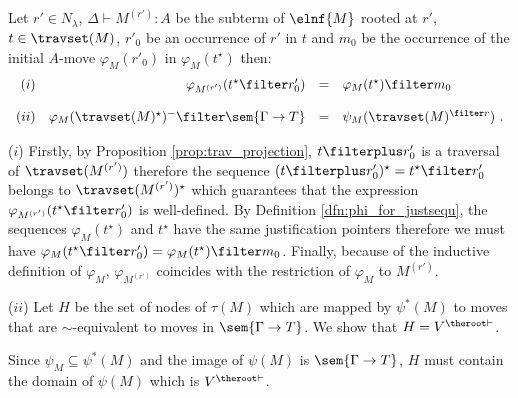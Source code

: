 \begin{lemma}
\label{lem:varphi_proj} Let $r'\in N_\lambda$, $\Delta \vdash
M^{(r')} : A$ be the subterm of $\elnf{M}$ rooted at $r'$,
$t\in\travset(M)$, $r'_0$ be an occurrence of $r'$ in $t$ and $m_0$
be the occurrence of the initial $A$-move $\varphi_M(r'_0)$ in
$\varphi_M(t^\star)$ then:
$$\begin{array}{rrcl}
(i)& \varphi_{M^{(r')}}(t^\star \filter r'_0) &=& \varphi_M(t^\star) \filter m_0 \\ \\
(ii) & \varphi_M(\travset(M)^\star)^- \filter \sem{\Gamma \rightarrow T} &=& \psi_M(\travset(M)^{\filter r})\ .
\end{array}
$$
\end{lemma}
\proof ($i$) Firstly, by Proposition \ref{prop:trav_projection},
$t\filterplus r'_0$ is a traversal of $\travset(M^{(r')})$ therefore
the sequence $(t\filterplus r'_0)^\star = t^\star \filter r'_0$
belongs to $\travset(M^{(r')})^\star$ which guarantees that the
expression $\varphi_{M^{(r')}}(t^\star \filter r'_0)$ is
well-defined. By Definition \ref{dfn:phi_for_justsequ}, the
sequences $\varphi_M(t^\star)$ and $t^\star$ have the same
justification pointers therefore
 we must have $\varphi_{M}(t^\star \filter r'_0) = \varphi_M(t^\star) \filter m_0$. Finally, because of the inductive definition of $\varphi_{M}$, $\varphi_{M^{(r')}}$ coincides with
the restriction of $\varphi_{M}$ to $M^{(r')}$.


($ii$) Let $H$ be the set of nodes of $\tau(M)$ which are mapped by
$\psi^*(M)$ to moves that are $\sim$-equivalent to moves in
$\sem{\Gamma \rightarrow T}$. We show that $H = V^{\theroot\vdash}$.

Since $\psi_M \subseteq \psi^*(M)$ and the image of $\psi(M)$ is
$\sem{\Gamma \rightarrow T}$, $H$ must contain the domain of
$\psi(M)$ which is $V^{\theroot\vdash}$.

